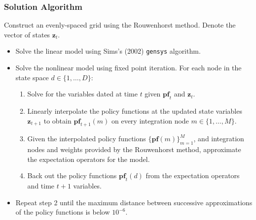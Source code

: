 \documentclass[11pt]{beamer}
\begin{document}
\begin{frame}\frametitle{Solution Algorithm} %
 Construct an evenly-spaced grid using the Rouwenhorst method. Denote the vector of states $\textbf{z}_t$. %
\begin{itemize}\setlength{\itemsep}{8pt}

\item <2-|handout:1>Solve the linear model using Sims's (2002) \texttt{gensys} algorithm. 
\item <3-|handout:1>Solve the nonlinear model using fixed point iteration. For each node in the state space $d \in \{1,\dots,D\}:$
\begin{enumerate}\setlength{\itemsep}{2pt}
\item <4-|handout:1>Solve for the variables dated at time $t$ given $\textbf{pf}_t$ and $\textbf{z}_t$. %
\item  <5-|handout:1>Linearly interpolate the policy functions at the updated state variables $\textbf{z}_{t+1}$ to obtain $\textbf{pf}_{t+1}(m)$ on every integration node $m \in \{1,\dots,M\}$.%
\item <6-|handout:1>Given the interpolated policy functions $\{\textbf{pf}(m)\}_{m=1}^M$, and integration nodes and weights provided by the Rouwenhorst method, approximate the expectation operators for the model. %
\item <7-|handout:1>Back out the policy functions $\textbf{pf}_t(d)$ from the expectation operators and time $t+1$ variables. %
\end{enumerate}
\item <8-|handout:1>Repeat step 2 until the maximum distance between successive approximations of the policy functions is below $10^{-6}$. 
\end{itemize}
\end{frame}
\end{document}
